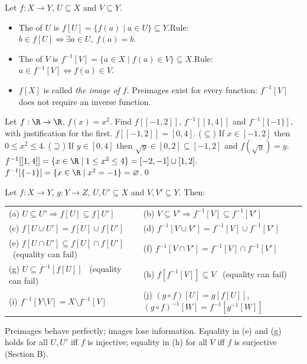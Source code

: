 \begin{key}
Let $f:X\to Y$, $U\subseteq X$ and $V\subseteq Y$.
\begin{itemize}
\item The  of $U$ is $f[U]=\{f(a)\mid a\in U\}\subseteq Y$.\quad Rule: $b\in f[U]\Leftrightarrow\exists a\in U,\ f(a)=b$.
\item The  of $V$ is $f^{-1}[V]=\{a\in X\mid f(a)\in V\}\subseteq X$.\quad Rule: $a\in f^{-1}[V]\Leftrightarrow f(a)\in V$.
\item $f[X]$ is called \emph{the image of $f$}. Preimages exist for every function: $f^{-1}[V]$ does not require an inverse function.
\end{itemize}
\end{key}

\begin{hexample}
Let $f:\R\to\R$, $f(x)=x^2$. Find $f[[-1,2]]$, $f^{-1}[[1,4]]$ and $f^{-1}[\{-1\}]$, with justification for the first.
\solution
$f[[-1,2]]=[0,4]$. ($\subseteq$) If $x\in[-1,2]$ then $0\le x^2\le4$. ($\supseteq$) If $y\in[0,4]$ then $\sqrt y\in[0,2]\subseteq[-1,2]$ and $f(\sqrt y)=y$.\\
$f^{-1}[[1,4]]=\{x\in\R\mid 1\le x^2\le4\}=[-2,-1]\cup[1,2]$.\qquad $f^{-1}[\{-1\}]=\{x\in\R\mid x^2=-1\}=\varnothing$.\qed
\end{hexample}

\begin{result}
Let $f:X\to Y$, $g:Y\to Z$, $U,U'\subseteq X$ and $V,V'\subseteq Y$. Then:
\begin{center}\small
\begin{tabular}{@{}l l@{}}
\toprule
(a) $U\subseteq U'\Rightarrow f[U]\subseteq f[U']$ & (b) $V\subseteq V'\Rightarrow f^{-1}[V]\subseteq f^{-1}[V']$\\
(c) $f[U\cup U']=f[U]\cup f[U']$ & (d) $f^{-1}[V\cup V']=f^{-1}[V]\cup f^{-1}[V']$\\
(e) $f[U\cap U']\subseteq f[U]\cap f[U']$ \ (equality can fail) & (f) $f^{-1}[V\cap V']=f^{-1}[V]\cap f^{-1}[V']$\\
(g) $U\subseteq f^{-1}[f[U]]$ \ (equality can fail) & (h) $f[f^{-1}[V]]\subseteq V$ \ (equality can fail)\\
(i) $f^{-1}[Y\setminus V]=X\setminus f^{-1}[V]$ & (j) $(g\circ f)[U]=g[f[U]]$, \ $(g\circ f)^{-1}[W]=f^{-1}[g^{-1}[W]]$\\
\bottomrule
\end{tabular}
\end{center}
Preimages behave perfectly; images lose information. Equality in (e) and (g) holds for all $U,U'$ iff $f$ is injective; equality in (h) for all $V$ iff $f$ is surjective (Section B).
\end{result}


